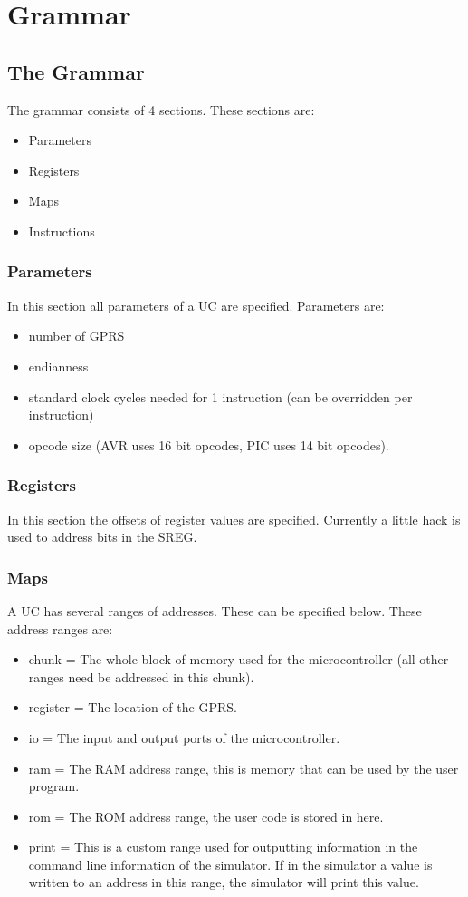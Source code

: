 \chapter{Grammar}

\section{The Grammar}
The grammar consists of 4 sections. These sections are:
\begin{itemize}
\item Parameters
\item Registers
\item Maps
\item Instructions
\end{itemize}

\subsection{Parameters}
In this section all parameters of a \ac{UC} are specified. Parameters are: 

\begin{itemize}
\item number of \ac{GPRS} 
\item endianness
\item standard clock cycles needed for 1 instruction (can be overridden per instruction)
\item opcode size (AVR uses 16 bit opcodes, PIC uses 14 bit opcodes).
\end{itemize} 

\subsection{Registers}
In this section the offsets of register values are specified. Currently a little hack is used to address bits in the \ac{SREG}.

\subsection{Maps}
A \ac{UC} has several ranges of addresses. These can be specified below. These address ranges are:
\begin{itemize}
\item chunk = The whole block of memory used for the microcontroller (all other ranges need be addressed in this chunk).
\item register = The location of the \ac{GPRS}.
\item io = The input and output ports of the microcontroller.
\item ram = The \ac{RAM} address range, this is memory that can be used by the user program.
\item rom = The \ac{ROM} address range, the user code is stored in here. 
\item print = This is a custom range used for outputting information in the command line information of the simulator. If in the simulator a value is written to an address in this range, the simulator will print this value.
\end{itemize}

